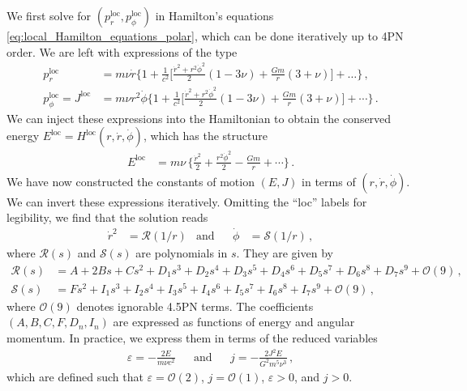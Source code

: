 \documentclass[prd,superscriptaddress,preprintnumbers,tightenlines,nofootinbib, eqsecnum]{revtex4-2}
\begin{document}
We first solve for $(p_r^\text{loc},p_\phi^\text{loc})$ in Hamilton's equations \eqref{eq:local_Hamilton_equations_polar}, which can be done iteratively up to 4PN order. We are left with expressions of the type
\begin{subequations}\label{eq:pr_pphi_of_rDot_phiDot}
    \begin{align} \label{seq:pr_of_rDot_phiDot}
    p_r^\text{loc}&= m \nu \dot{r}   \Biggl\{1+\frac{1}{c^2}\Biggl[\frac{\dot{r}^2+r^2 \dot{\phi}^2}{2} \left(1-3 \nu \right)  +\frac{G m}{r} (3+\nu )  \Biggr] + \dots \Biggr\}\,,\\
    \label{seq:pphi_of_rDot_phiDot}
    p_\phi^\text{loc}=J^\text{loc}&= m \nu r^2 \dot{\phi}\Biggl\{1+\frac{1}{c^2}\Biggl[\frac{\dot{r}^2+r^2 \dot{\phi}^2}{2} \left(1-3 \nu \right)  +\frac{G m}{r} (3+\nu )   \Biggr] + \cdots \Biggr\} \,.
\end{align}
\end{subequations}
%
We can inject these expressions into the Hamiltonian to obtain the conserved energy $E^\text{loc}=H^\text{loc}(r,\dot{r},\dot{\phi})$, which has the structure 
\begin{align}\label{eq:E_of_rDot_phiDot}
    E^\text{loc} & =m \nu  \, \Biggl\{\frac{\dot{r}^2}{2}+\frac{r^2 \dot{\phi}^2}{2}-\frac{G m}{r}+ \cdots \Biggr\} \,.
\end{align}
We have now constructed the constants of motion $(E,J)$ in terms of $(r,\dot{r},\dot{\phi})$. We can invert these expressions iteratively. Omitting the ``loc'' labels for legibility, we find that the solution reads
\begin{align} \label{eq:rDot2_phiDot_of_r}
    \dot{r}^2 &= \mathcal{R}(1/r) &\text{and}&& \dot{\phi} &= \mathcal{S}(1/r)\,,
\end{align}
where $\mathcal{R}(s)$ and $\mathcal{S}(s)$ are polynomials in $s$. They are given by
\begin{subequations}
   \label{eq:R_S_of_s}
\begin{align}   \label{seq:R_of_s}
   \mathcal{R}(s) &= A + 2B s + C s^2 + D_1 s^3 + D_2 s^4 + D_3 s^5 + D_4 s^6  + D_5 s^7 + D_6 s^8 + D_7 s^9 + \mathcal{O}(9)   \,,  \\  \label{seq:S_of_s}
   \mathcal{S}(s) &= F s^2 + I_1 s^3 + I_2 s^4 + I_3 s^5 + I_4 s^6  + I_5 s^7 + I_6 s^8 + I_7 s^9 + \mathcal{O}(9)  \,,
\end{align} 
\end{subequations}
%
where $\mathcal{O}(9)$ denotes ignorable 4.5PN terms. The coefficients $(A,B,C,F,D_n,I_n)$ are expressed as functions of energy and angular momentum. In practice, we express them in terms of the reduced variables
\begin{align}   \label{eq:def_varepsilon_j}
    \varepsilon= - \frac{2E}{m\nu c^2} &&\text{and}&& j = -\frac{2 J^2 E}{G^2 m^5 \nu^3} \,,
\end{align}
which are defined such that $\varepsilon=\mathcal{O}(2)$, $j=\mathcal{O}(1)$, $\varepsilon>0$, and $j>0$. 
\end{document}
